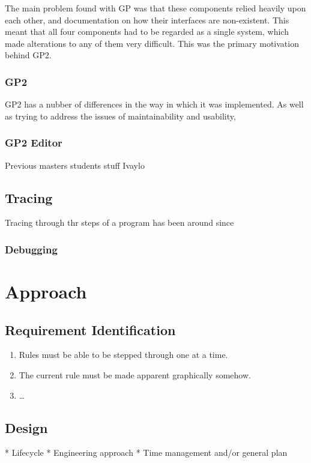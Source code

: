 \documentclass{UoYCSproject}
\begin{document}
The main problem found with GP was that these components relied heavily upon each other, and documentation on how their interfaces are non-existent. %
This meant that all four components had to be regarded as a single system, which made alterations to any of them very difficult. This was the primary motivation behind GP2.

\subsection{GP2}

GP2 has a nubber of differences in the way in which it was implemented. As well as trying to address the issues of maintainability and usability, 

\subsection{GP2 Editor}
Previous masters students stuff
Ivaylo
\section{Tracing}
Tracing through thr steps of a program has been around since %
\subsection{Debugging}

\chapter{Approach}
\section{Requirement Identification}
\begin{enumerate}
	\item Rules must be able to be stepped through one at a time.
 	\item The current rule must be made apparent graphically somehow.
	\item \ldots
\end{enumerate}
\section{Design}
 * Lifecycle
 * Engineering approach
 * Time management and/or general plan
 
\end{document}
